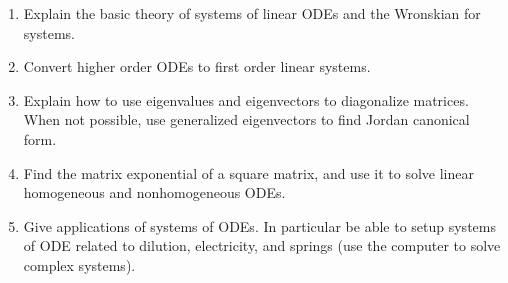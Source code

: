 
\begin{enumerate}


\item Explain the basic theory of systems of linear ODEs and the Wronskian for systems.
\item Convert higher order ODEs to first order linear systems.
\item Explain how to use eigenvalues and eigenvectors to diagonalize matrices. When not possible, use generalized eigenvectors to find Jordan canonical form.
\item Find the matrix exponential of a square matrix, and use it to solve linear homogeneous and nonhomogeneous ODEs. 
\item Give applications of systems of ODEs. In particular be able to setup systems of ODE related to dilution, electricity, and springs (use the computer to solve complex systems). 



\end{enumerate}


